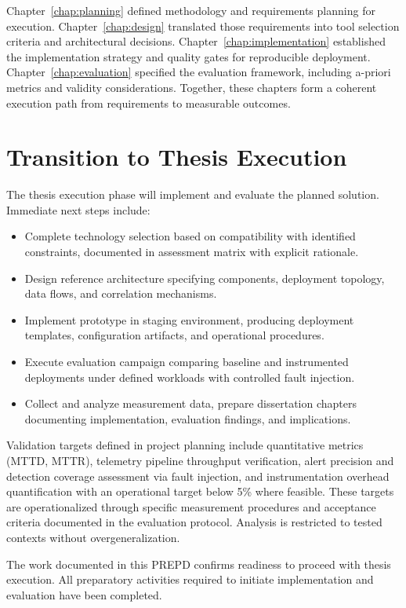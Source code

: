Chapter~\ref{chap:planning} defined methodology and requirements planning for execution. Chapter~\ref{chap:design} translated those requirements into tool selection criteria and architectural decisions. Chapter~\ref{chap:implementation} established the implementation strategy and quality gates for reproducible deployment. Chapter~\ref{chap:evaluation} specified the evaluation framework, including a-priori metrics and validity considerations. Together, these chapters form a coherent execution path from requirements to measurable outcomes.

\section{Transition to Thesis Execution}

The thesis execution phase will implement and evaluate the planned solution. Immediate next steps include:

\begin{itemize}
	\item Complete technology selection based on compatibility with identified constraints, documented in assessment matrix with explicit rationale.
	\item Design reference architecture specifying components, deployment topology, data flows, and correlation mechanisms.
	\item Implement prototype in staging environment, producing deployment templates, configuration artifacts, and operational procedures.
	\item Execute evaluation campaign comparing baseline and instrumented deployments under defined workloads with controlled fault injection.
	\item Collect and analyze measurement data, prepare dissertation chapters documenting implementation, evaluation findings, and implications.
\end{itemize}

Validation targets defined in project planning include quantitative metrics (\ac{MTTD}, \ac{MTTR}), telemetry pipeline throughput verification, alert precision and detection coverage assessment via fault injection, and instrumentation overhead quantification with an operational target below 5\% where feasible. These targets are operationalized through specific measurement procedures and acceptance criteria documented in the evaluation protocol. Analysis is restricted to tested contexts without overgeneralization.

The work documented in this \ac{PREPD} confirms readiness to proceed with thesis execution. All preparatory activities required to initiate implementation and evaluation have been completed.

